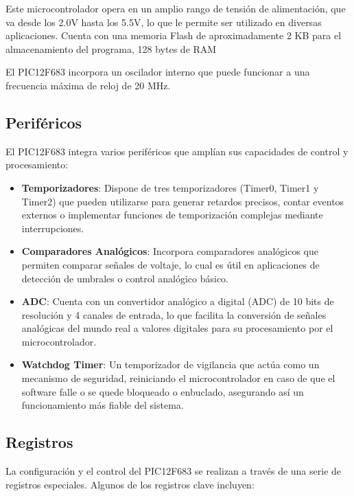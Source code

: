 \documentclass[12pt,a4paper]{article}
\begin{document}
Este microcontrolador opera en un amplio rango de tensión de
alimentación, que va desde los 2.0V hasta los 5.5V, lo que
le permite ser utilizado en diversas aplicaciones. Cuenta con
una memoria Flash de aproximadamente 2 KB 
para el almacenamiento del programa, 128 bytes
de RAM 

El PIC12F683 incorpora un oscilador interno que 
puede funcionar a una frecuencia máxima de reloj de 20 MHz.

\subsection{Periféricos}

El PIC12F683 integra varios periféricos que amplían sus
capacidades de control y procesamiento:

\begin{itemize}
    \item \textbf{Temporizadores}: Dispone de tres temporizadores
    (Timer0, Timer1 y Timer2) que pueden utilizarse para
    generar retardos precisos, contar eventos externos o
    implementar funciones de temporización complejas mediante
    interrupciones.
    \item \textbf{Comparadores Analógicos}: Incorpora comparadores
    analógicos que permiten comparar señales de voltaje, lo
    cual es útil en aplicaciones de detección de umbrales o
    control analógico básico.
    \item \textbf{ADC}: Cuenta con un convertidor analógico a
    digital (ADC) de 10 bits de resolución y 4 canales de
    entrada, lo que facilita la conversión de señales
    analógicas del mundo real a valores digitales para su
    procesamiento por el microcontrolador.
    \item \textbf{Watchdog Timer}: Un temporizador de vigilancia
    que actúa como un mecanismo de seguridad, reiniciando el
    microcontrolador en caso de que el software falle o se
    quede bloqueado o enbuclado, asegurando así un funcionamiento más
    fiable del sistema.

\end{itemize}

\subsection{Registros}

La configuración y el control del PIC12F683 se realizan a
través de una serie de registros especiales. Algunos de los
registros clave incluyen:
\end{document}
